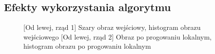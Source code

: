\documentclass[a4paper,12pt, titlepage]{report}
\begin{document}
\subsection*{Efekty wykorzystania algorytmu}
\begin{figure}[h]
    \centering
    \qquad
    \caption{[Od lewej, rząd 1] Szary obraz wejściowy, histogram obrazu wejściowego [Od lewej, rząd 2] Obraz po progowaniu lokalnym, histogram obrazu po progowaniu lokalnym}%
    \label{fig:geo_after_grey1}%
\end{figure}
\end{document}

